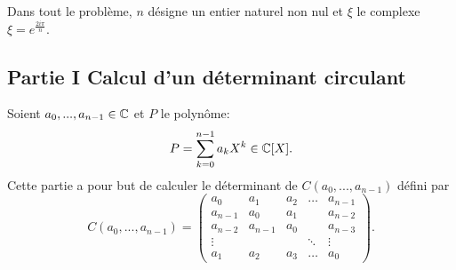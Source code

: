 Dans tout le problème, $n$ désigne un entier naturel non nul et $\xi$ le complexe $\xi = e^{\frac{2i\pi}{n}}$. 

\subsection*{Partie I Calcul d'un déterminant circulant}

Soient $a_{0}, ..., a_{n-1}\in \mathbb{C}$ et $P$ le polynôme:
\[
P = \sum_{k=0}^{n-1}a_{k}X^{k} \in \mathbb{C}[X].
\]
Cette partie a pour but de calculer le déterminant de $C(a_{0}, ..., a_{n-1})$ défini par 
\[ 
C(a_{0}, ..., a_{n-1}) =\begin{pmatrix}
       a_{0} & a_{1} & a_{2} & \hdots & a_{n-1}\\
       a_{n-1}& a_{0} & a_{1} & & a_{n-2}\\
       a_{n-2} & a_{n-1} & a_{0} & & a_{n-3}\\
       \vdots & & & \ddots & \vdots \\
       a_{1} & a_{2} & a_{3} & \hdots & a_{0}
      \end{pmatrix}.
\]

